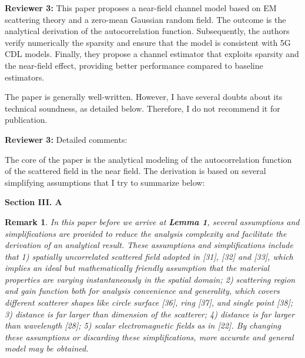 \documentclass[a4paper,12pt]{article}
\newtheorem{remark}{\bf Remark}
\begin{document}
\textbf{Reviewer 3:}
This paper proposes a near-field channel model based on EM scattering theory and a zero-mean Gaussian random field. The outcome is the analytical derivation of the autocorrelation function. Subsequently, the authors verify numerically the sparsity and ensure that the model is consistent with 5G CDL models. Finally, they propose a channel estimator that exploits sparsity and the near-field effect, providing better performance compared to baseline estimators.

The paper is generally well-written. However, I have several doubts about its technical soundness, as detailed below. Therefore, I do not recommend it for publication.

{}

\textbf{Reviewer 3:}
Detailed comments:

The core of the paper is the analytical modeling of the autocorrelation function of the scattered field in the near field. The derivation is based on several simplifying assumptions that I try to summarize below:

{}

\begin{framed}
	{\bf Section III. A}

    {\color{red}
\begin{remark}
    \quad In this paper before we arrive at {\bf Lemma 1}, several assumptions and simplifications are provided to reduce the analysis complexity and facilitate the derivation of an analytical result. These assumptions and simplifications include that 1) spatially uncorrelated scattered field adopted in [31], [32] and [33], which implies an ideal but mathematically friendly assumption that the material properties are varying instantaneously in the spatial domain; 2) scattering region and gain function both for analysis convenience and generality, which covers different scatterer shapes like circle surface [36], ring [37], and single point [38]; 3) distance is far larger than dimension of the scatterer; 4) distance is far larger than wavelength [28]; 5) scalar electromagnetic fields as in [22]. By changing these assumptions or discarding these simplifications, more accurate and general model may be obtained. 
	\end{remark}}

\end{framed}
\end{document}
